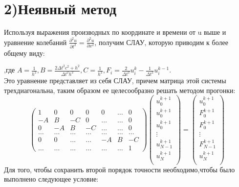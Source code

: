 \documentclass[]{article}
\begin{document}
	\section*{2)Неявный метод}
		Используя выражения производных по координате и времени от u выше и уравнение колебаний $\frac{\partial^2 u}{\partial t^2} = \frac{\partial^2 u}{\partial x^2}$, получим СЛАУ, которую приводим к более общему виду:\\
		\begin{center}
		\end{center}
		,где $A = \frac{1}{h^2}, B = \frac{2\Delta t^2 c^2+h^2}{\Delta t^2 h^2}, C =  \frac{1}{h^2}, F_i = \frac{2}{\Delta t^2}u_i^k - \frac{1}{\Delta t^2}u_i^{k-1}$.\\
		Это уравнение представляет из себя СЛАУ, причем матрица этой системы трехдиагональна, таким образом ее целесообразно решать методом прогонки:\\
		\[\begin{pmatrix}
			1&0&0&0&0&\dots&0\\
			-A&B&-C&0&\dots&\dots&0\\
			0&-A&B&-C&\dots&\dots&0\\
			\dots&\dots&\dots&\dots&\dots&\dots&\dots\\
			0&0&\dots&\dots&-A&B&-C\\
			\dots&\dots&\dots&\dots&\dots&\dots&1
		\end{pmatrix}
		\begin{pmatrix}
			u_0^{k+1}\\
			u_0^{k+1}\\
			u_0^{k+1}\\
			\vdots\\
			u_{N-1}^{k+1}\\
			u_{N}^{k+1}\\
		\end{pmatrix}
	=
	\begin{pmatrix}
		u_0^{k+1}\\
		F_0^{k+1}\\
		F_0^{k+1}\\
		\vdots\\
		F_{N-1}^{k+1}\\
		u_{N}^{k+1}\\
	\end{pmatrix}
	\]
	\newpage
	Для того, чтобы сохранить второй порядок точности необходимо,чтобы было выполнено следующее условие:\\
	\begin{center}
	\end{center}
\end{document}
